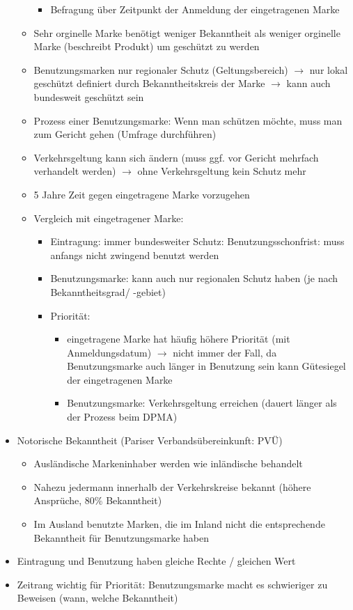 \documentclass{report}
\begin{document}
\begin{itemize}
\begin{itemize}
\begin{itemize}
			\item Befragung über Zeitpunkt der Anmeldung der eingetragenen Marke
		\end{itemize}
		\item Sehr orginelle Marke benötigt weniger Bekanntheit als weniger orginelle Marke (beschreibt Produkt) um geschützt zu werden
		\item Benutzungsmarken nur regionaler Schutz (Geltungsbereich) $\rightarrow$ nur lokal geschützt
		\newline definiert durch Bekanntheitskreis der Marke $\rightarrow$ kann auch bundesweit geschützt sein
		\item Prozess einer Benutzungsmarke:
		\newline Wenn man schützen möchte, muss man zum Gericht gehen (Umfrage durchführen)
		\item Verkehrsgeltung kann sich ändern (muss ggf. vor Gericht mehrfach verhandelt werden) $\rightarrow$ ohne Verkehrsgeltung kein Schutz mehr
		\item 5 Jahre Zeit gegen eingetragene Marke vorzugehen
		\item Vergleich mit eingetragener Marke:
		\begin{itemize}
			\item Eintragung: immer bundesweiter Schutz:
			\newline Benutzungsschonfrist: muss anfangs nicht zwingend benutzt werden
			\item Benutzungsmarke: kann auch nur regionalen Schutz haben (je nach Bekanntheitsgrad/ -gebiet)
			\item Priorität:
			\begin{itemize}
				\item eingetragene Marke hat häufig höhere Priorität (mit Anmeldungsdatum)
				\newline $\rightarrow$ nicht immer der Fall, da Benutzungsmarke auch länger in Benutzung sein kann
				\newline Gütesiegel der eingetragenen Marke
				\item Benutzungsmarke: Verkehrsgeltung erreichen (dauert länger als der Prozess beim DPMA)
			\end{itemize}
		\end{itemize}
	\end{itemize}
	\item Notorische Bekanntheit (Pariser Verbandsübereinkunft: PVÜ)
	\begin{itemize}
		\item Ausländische Markeninhaber werden wie inländische behandelt
		\item Nahezu jedermann innerhalb der Verkehrskreise bekannt (höhere Ansprüche, 80\% Bekanntheit)
		\item Im Ausland benutzte Marken, die im Inland nicht die entsprechende Bekanntheit für Benutzungsmarke haben
	\end{itemize}
	\item Eintragung und Benutzung haben gleiche Rechte / gleichen Wert
	\item Zeitrang wichtig für Priorität: Benutzungsmarke macht es schwieriger zu Beweisen (wann, welche Bekanntheit)
\end{itemize}
\end{document}
